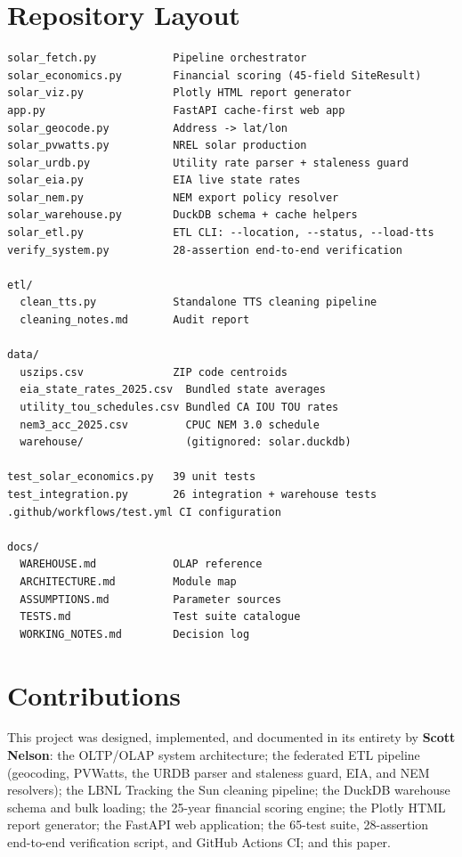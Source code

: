 \documentclass[10pt, conference]{IEEEtran}
\begin{document}
\appendix

\section{Repository Layout}

\begin{lstlisting}[basicstyle=\ttfamily\scriptsize]
solar_fetch.py            Pipeline orchestrator
solar_economics.py        Financial scoring (45-field SiteResult)
solar_viz.py              Plotly HTML report generator
app.py                    FastAPI cache-first web app
solar_geocode.py          Address -> lat/lon
solar_pvwatts.py          NREL solar production
solar_urdb.py             Utility rate parser + staleness guard
solar_eia.py              EIA live state rates
solar_nem.py              NEM export policy resolver
solar_warehouse.py        DuckDB schema + cache helpers
solar_etl.py              ETL CLI: --location, --status, --load-tts
verify_system.py          28-assertion end-to-end verification

etl/
  clean_tts.py            Standalone TTS cleaning pipeline
  cleaning_notes.md       Audit report

data/
  uszips.csv              ZIP code centroids
  eia_state_rates_2025.csv  Bundled state averages
  utility_tou_schedules.csv Bundled CA IOU TOU rates
  nem3_acc_2025.csv         CPUC NEM 3.0 schedule
  warehouse/                (gitignored: solar.duckdb)

test_solar_economics.py   39 unit tests
test_integration.py       26 integration + warehouse tests
.github/workflows/test.yml CI configuration

docs/
  WAREHOUSE.md            OLAP reference
  ARCHITECTURE.md         Module map
  ASSUMPTIONS.md          Parameter sources
  TESTS.md                Test suite catalogue
  WORKING_NOTES.md        Decision log
\end{lstlisting}

\section{Contributions}

\noindent This project was designed, implemented, and documented in its
entirety by \textbf{Scott Nelson}: the OLTP/OLAP system architecture; the
federated ETL pipeline (geocoding, PVWatts, the URDB parser and staleness
guard, EIA, and NEM resolvers); the LBNL Tracking the Sun cleaning
pipeline; the DuckDB warehouse schema and bulk loading; the 25-year
financial scoring engine; the Plotly HTML report generator; the FastAPI
web application; the 65-test suite, 28-assertion end-to-end verification
script, and GitHub Actions CI; and this paper.
\end{document}

